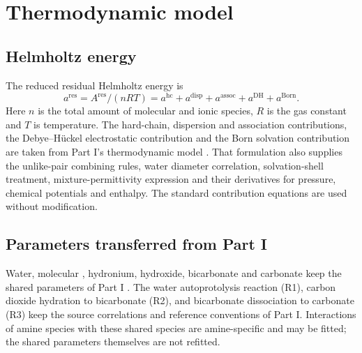 \section{Thermodynamic model}\label{sec:p2-model}
\subsection{Helmholtz energy}\label{sec:p2-helmholtz}
The reduced residual Helmholtz energy is
\begin{equation}
 a^{\mathrm{res}}=A^{\mathrm{res}}/(nRT)
 =a^{\mathrm{hc}}+a^{\mathrm{disp}}+a^{\mathrm{assoc}}+a^{\mathrm{DH}}+a^{\mathrm{Born}}.
 \label{eq:p2-epcsaft-residual-split}
\end{equation}
Here $n$ is the total amount of molecular and ionic species, $R$ is the gas constant and $T$ is temperature.
The hard-chain, dispersion and association contributions, the Debye--H\"uckel electrostatic contribution and the Born solvation contribution are taken from Part I's thermodynamic model \cite[Sect.~2]{PolleyPartI}.
That formulation also supplies the unlike-pair combining rules, water diameter correlation, solvation-shell treatment, mixture-permittivity expression and their derivatives for pressure, chemical potentials and enthalpy.
The standard contribution equations are used without modification.

\subsection{Parameters transferred from Part I}\label{sec:p2-shared}
Water, molecular \COtwo, hydronium, hydroxide, bicarbonate and carbonate keep the shared parameters of Part I \cite[Table~10]{PolleyPartI}.
The water autoprotolysis reaction (R1), carbon dioxide hydration to bicarbonate (R2), and bicarbonate dissociation to carbonate (R3) keep the source correlations and reference conventions of Part I.
Interactions of amine species with these shared species are amine-specific and may be fitted; the shared parameters themselves are not refitted.

